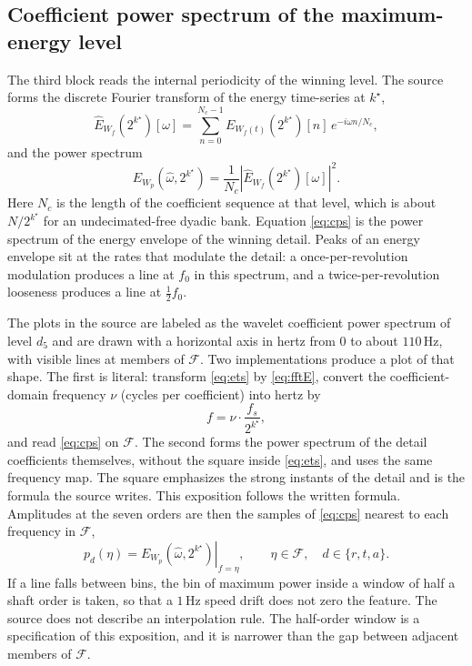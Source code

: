 \subsection{Coefficient power spectrum of the maximum-energy level}

The third block reads the internal periodicity of the winning level.
The source forms the discrete Fourier transform of the energy time-series at \(k^{\star}\),
\begin{equation}
\widehat{E}_{W_{f}}(2^{k^{\star}})[\omega]
=\sum_{n=0}^{N_{c}-1} E_{W_{f}(t)}(2^{k^{\star}})[n]\,e^{-i\omega n/N_{c}},
\label{eq:fftE}
\end{equation}
and the power spectrum
\begin{equation}
E_{W_{p}}(\hat{\omega}, 2^{k^{\star}})
=\frac{1}{N_{c}}\left|\widehat{E}_{W_{f}}(2^{k^{\star}})[\omega]\right|^{2}.
\label{eq:cps}
\end{equation}
Here \(N_{c}\) is the length of the coefficient sequence at that level, which is about \(N/2^{k^{\star}}\) for an undecimated-free dyadic bank.
Equation \eqref{eq:cps} is the power spectrum of the energy envelope of the winning detail.
Peaks of an energy envelope sit at the rates that modulate the detail: a once-per-revolution modulation produces a line at \(f_{0}\) in this spectrum, and a twice-per-revolution looseness produces a line at \(\tfrac12 f_{0}\).

The plots in the source are labeled as the wavelet coefficient power spectrum of level \(d_{5}\) and are drawn with a horizontal axis in hertz from \(0\) to about \(110\,\mathrm{Hz}\), with visible lines at members of \(\mathcal{F}\).
Two implementations produce a plot of that shape.
The first is literal: transform \eqref{eq:ets} by \eqref{eq:fftE}, convert the coefficient-domain frequency \(\nu\) (cycles per coefficient) into hertz by
\begin{equation}
f=\nu\cdot\frac{f_{s}}{2^{k^{\star}}},
\label{eq:fmap}
\end{equation}
and read \eqref{eq:cps} on \(\mathcal{F}\).
The second forms the power spectrum of the detail coefficients themselves, without the square inside \eqref{eq:ets}, and uses the same frequency map.
The square emphasizes the strong instants of the detail and is the formula the source writes.
This exposition follows the written formula.
Amplitudes at the seven orders are then the samples of \eqref{eq:cps} nearest to each frequency in \(\mathcal{F}\),
\begin{equation}
p_{d}(\eta)=\left. E_{W_{p}}(\hat{\omega}, 2^{k^{\star}}) \right|_{f=\eta},
\qquad \eta\in\mathcal{F},\quad d\in\{r, t, a\}.
\label{eq:samples}
\end{equation}
If a line falls between bins, the bin of maximum power inside a window of half a shaft order is taken, so that a \(1\,\mathrm{Hz}\) speed drift does not zero the feature.
The source does not describe an interpolation rule.
The half-order window is a specification of this exposition, and it is narrower than the gap between adjacent members of \(\mathcal{F}\).


